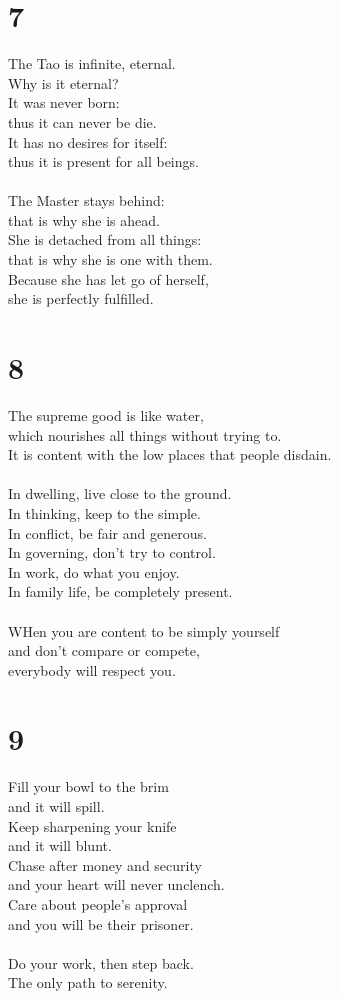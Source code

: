 \documentclass[b5paper, 12pt, oneside]{book}
\begin{document}
\chapter*{7}
The Tao is infinite, eternal.\\
Why is it eternal?\\
It was never born:\\
thus it can never be die.\\
It has no desires for itself:\\
thus it is present for all beings.\\
\\
The Master stays behind:\\
that is why she is ahead.\\
She is detached from all things:\\
that is why she is one with them.\\
Because she has let go of herself,\\
she is perfectly fulfilled.\\

\chapter*{8}
The supreme good is like water,\\
which nourishes all things without trying to.\\
It is content with the low places that people disdain.\\
\\
In dwelling, live close to the ground.\\
In thinking, keep to the simple.\\
In conflict, be fair and generous.\\
In governing, don't try to control.\\
In work, do what you enjoy.\\
In family life, be completely present.\\
\\
WHen you are content to be simply yourself\\
and don't compare or compete,\\
everybody will respect you.

\chapter*{9}
Fill your bowl to the brim\\
and it will spill.\\
Keep sharpening your knife\\
and it will blunt.\\
Chase after money and security\\
and your heart will never unclench.\\
Care about people's approval\\
and you will be their prisoner.\\
\\
Do your work, then step back.\\
The only path to serenity.\\
\end{document}
